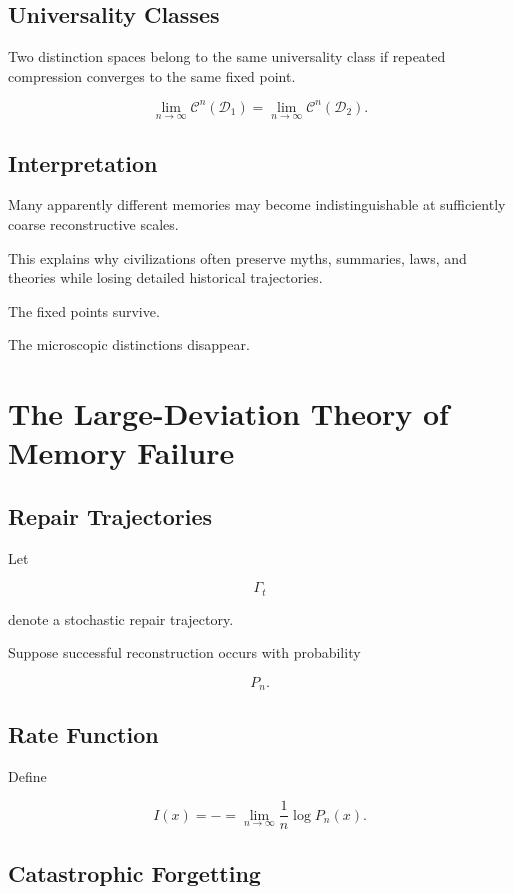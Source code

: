 \documentclass[12pt,oneside]{book}
\theoremstyle{plain} \newtheorem{theorem}{Theorem}[chapter] \newtheorem{lemma}[theorem]{Lemma} \newtheorem{proposition}[theorem]{Proposition} \newtheorem{corollary}[theorem]{Corollary}
\theoremstyle{definition} \newtheorem{definition}[theorem]{Definition} \newtheorem{axiom}[theorem]{Axiom} \newtheorem{construction}[theorem]{Construction}
\theoremstyle{remark} \newtheorem{remark}[theorem]{Remark} \newtheorem{example}[theorem]{Example}
\newcommand{\D}{\mathcal{D}} \newcommand{\R}{\mathcal{R}} \newcommand{\F}{\mathcal{F}} \newcommand{\U}{\mathcal{U}} \newcommand{\M}{\mathcal{M}} \newcommand{\G}{\Gamma}
\begin{document}
\section{Universality Classes}

Two distinction spaces belong to the same universality class if repeated compression converges to the same fixed point.

\[
\lim_{n\to\infty}
\mathcal C^n(\D_1)
=
\lim_{n\to\infty}
\mathcal C^n(\D_2).
\]

\section{Interpretation}

Many apparently different memories may become indistinguishable at sufficiently coarse reconstructive scales.

This explains why civilizations often preserve myths, summaries, laws, and theories while losing detailed historical trajectories.

The fixed points survive.

The microscopic distinctions disappear.

\chapter{The Large-Deviation Theory of Memory Failure}

\section{Repair Trajectories}

Let

\[
\Gamma_t
\]

denote a stochastic repair trajectory.

Suppose successful reconstruction occurs with probability

\[
P_n.
\]

\section{Rate Function}

Define

\[
I(x)
=
- 
=
\lim_{n\rightarrow\infty}
\frac1n
\log P_n(x).
\]

\section{Catastrophic Forgetting}
\end{document}
